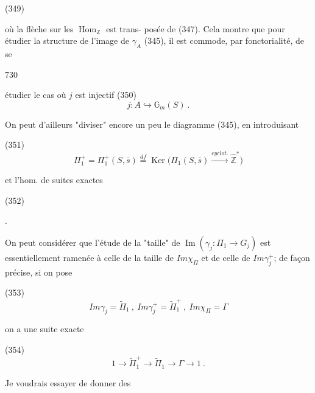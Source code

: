 (349)

où la flèche sur les $\operatorname{Hom}_{\mathbb{Z}}$ est trans-
posée de (347). Cela montre que
pour étudier la structure de l'image de $\gamma_A$ (345),
il est commode, par fonctorialité, de se

\newpage


730

étudier le cas où $j$ est injectif
(350) $$j : A \hookrightarrow \mathbb{G}_m(S) \ .$$

On peut d'ailleurs "diviser" encore un peu le diagramme (345), en introduisant

(351) $$\Pi_1^+ = \Pi_1^+(S, \bar{s}) \overset{df}{=} \operatorname{Ker}\Big(\Pi_1(S, \bar{s}) \overset{cyclot.}{\longrightarrow} \hat{\mathbb{Z}}^*\Big)$$

et l'hom. de suites exactes

(352)
.

On peut considérer que l'étude de la "taille" de $\operatorname{Im}(\gamma_j : \Pi_1 \to G_j)$ est essentiellement ramenée à celle de la taille de $Im \chi_{\Pi}$ et de celle de $Im \gamma_j^+$; de façon précise, si on pose

(353) $$Im \gamma_j = \tilde{\Pi}_1 \ , \ Im \gamma_j^+ = \tilde{\Pi}_1^+ \ , \ Im \chi_{\Pi} = \Gamma$$

on a une suite exacte

(354) $$1 \to \tilde{\Pi}_1^+ \to \tilde{\Pi}_1 \to \Gamma \to 1 \ .$$

Je voudrais essayer de donner des

\newpage


